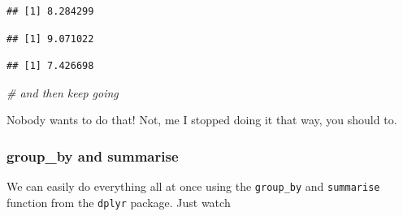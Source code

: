 \documentclass[]{book}
\newenvironment{Shaded}{\begin{snugshade}}{\end{snugshade}}
\newcommand{\KeywordTok}[1]{\textcolor[rgb]{0.13,0.29,0.53}{\textbf{{#1}}}}
\newcommand{\DataTypeTok}[1]{\textcolor[rgb]{0.13,0.29,0.53}{{#1}}}
\newcommand{\StringTok}[1]{\textcolor[rgb]{0.31,0.60,0.02}{{#1}}}
\newcommand{\CommentTok}[1]{\textcolor[rgb]{0.56,0.35,0.01}{\textit{{#1}}}}
\newcommand{\NormalTok}[1]{{#1}}
\theoremstyle{definition}
\theoremstyle{definition}
\theoremstyle{definition}
\theoremstyle{remark}
\begin{document}
\begin{verbatim}
## [1] 8.284299
\end{verbatim}

\begin{Shaded}
\end{Shaded}

\begin{verbatim}
## [1] 9.071022
\end{verbatim}

\begin{Shaded}
\end{Shaded}

\begin{verbatim}
## [1] 7.426698
\end{verbatim}

\begin{Shaded}
\begin{Highlighting}[]
\CommentTok{# and then keep going}
\end{Highlighting}
\end{Shaded}

Nobody wants to do that! Not, me I stopped doing it that way, you should
to.

\subsubsection{group\_by and summarise}\label{group_by-and-summarise}

We can easily do everything all at once using the \texttt{group\_by} and
\texttt{summarise} function from the \texttt{dplyr} package. Just watch

\begin{Shaded}
\end{Shaded}
\end{document}
